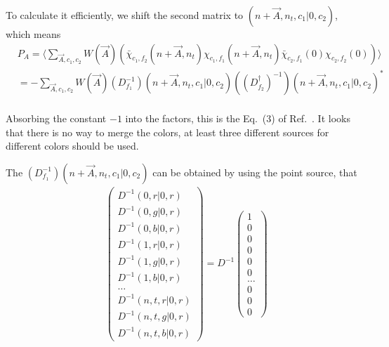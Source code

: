 To calculate it efficiently, we shift the second matrix to $(n+\vec{A},n_t,c_1|0,c_2)$, which means
\begin{equation}
\begin{split}
&P_A=\langle \sum _{\vec{A},c_1,c_2}W(\vec{A})\left(\bar{\chi}_{c_1,f_2}(n+\vec{A},n_t) \chi_{c_1,f_1}(n+\vec{A},n_t) \bar{\chi}_{c_2,f_1}(0) \chi_{c_2,f_2}(0)\right) \rangle\\
&=-\sum _{\vec{A},c_1,c_2}W(\vec{A}) \left(D_{f_1}^{-1}\right)\left(n+\vec{A},n_t,c_1|0,c_2\right)\left((D_{f_2}^{\dagger})^{-1}\right)\left(n+\vec{A},n_t,c_1|0,c_2\right)^*\\
\end{split}
\end{equation}

Absorbing the constant $-1$ into the factors, this is the Eq.~(3) of Ref.~\cite{Gottlieb:1988gr}. It looks that there is no way to merge the colors, at least three different sources for different colors should be used.

The $\left(D_{f_1}^{-1}\right)\left(n+\vec{A},n_t,c_1|0,c_2\right)$ can be obtained by using the point source, that
\begin{equation}
\begin{split}
&\begin{pmatrix} D^{-1}(0,r|0,r) \\ D^{-1}(0,g|0,r) \\ D^{-1}(0,b|0,r) \\ D^{-1}(1,r|0,r) \\ D^{-1}(1,g|0,r) \\ D^{-1}(1,b|0,r) \\ \ldots \\ D^{-1}(n,t,r|0,r) \\ D^{-1}(n,t,g|0,r) \\ D^{-1}(n,t,b|0,r) \end{pmatrix} = D^{-1} \begin{pmatrix} 1 \\ 0 \\ 0 \\ 0 \\ 0 \\ 0 \\ \ldots \\ 0 \\ 0 \\ 0 \end{pmatrix}\\
\end{split}
\end{equation}


